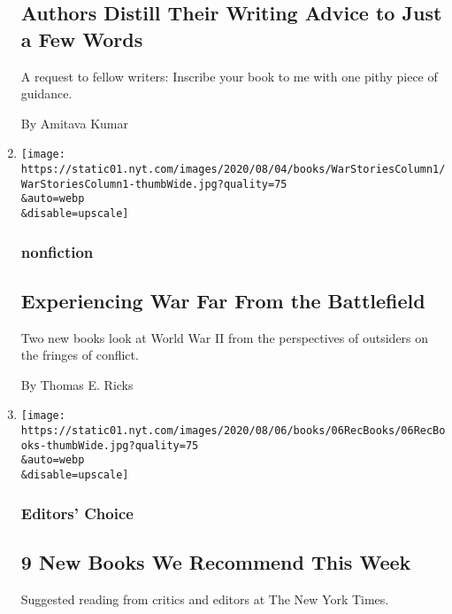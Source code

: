 \begin{enumerate}
  \hypertarget{authors-distill-their-writing-advice-to-just-a-few-words}{%
  \subsection{Authors Distill Their Writing Advice to Just a Few
  Words}\label{authors-distill-their-writing-advice-to-just-a-few-words}}

  A request to fellow writers: Inscribe your book to me with one pithy
  piece of guidance.

  By Amitava Kumar
\item
  \href{/2020/08/06/books/review/eileen-alexander-love-in-the-blitz-james-nolan-jr-atomic-doctors.html}{}

  \texttt{[image: https://static01.nyt.com/images/2020/08/04/books/WarStoriesColumn1/WarStoriesColumn1-thumbWide.jpg?quality=75\\\&auto=webp\\\&disable=upscale]}

  \hypertarget{nonfiction-1}{%
  \subsubsection{nonfiction}\label{nonfiction-1}}

  \hypertarget{experiencing-war-far-from-the-battlefield}{%
  \subsection{Experiencing War Far From the
  Battlefield}\label{experiencing-war-far-from-the-battlefield}}

  Two new books look at World War II from the perspectives of outsiders
  on the fringes of conflict.

  By Thomas E. Ricks
\item
  \href{/2020/08/06/books/review/9-new-books-we-recommend-this-week.html}{}

  \texttt{[image: https://static01.nyt.com/images/2020/08/06/books/06RecBooks/06RecBooks-thumbWide.jpg?quality=75\\\&auto=webp\\\&disable=upscale]}

  \hypertarget{editors-choice}{%
  \subsubsection{Editors' Choice}\label{editors-choice}}

  \hypertarget{9-new-books-we-recommend-this-week}{%
  \subsection{9 New Books We Recommend This
  Week}\label{9-new-books-we-recommend-this-week}}

  Suggested reading from critics and editors at The New York Times.
\end{enumerate}

